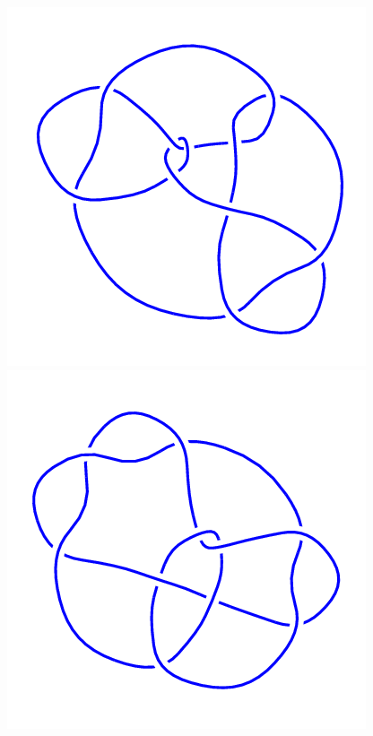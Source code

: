 \begin{figure}[H]
\begin{minipage}[b]{.18\linewidth}
    \end{minipage}
    \begin{minipage}[b]{.18\linewidth}
        \centering
        \includegraphics[width=\linewidth]{../data/10_154.png}
    \end{minipage}
    \begin{minipage}[b]{.18\linewidth}
        \centering
        \includegraphics[width=\linewidth]{../data/10_155.png}

\end{minipage}
\end{figure}
